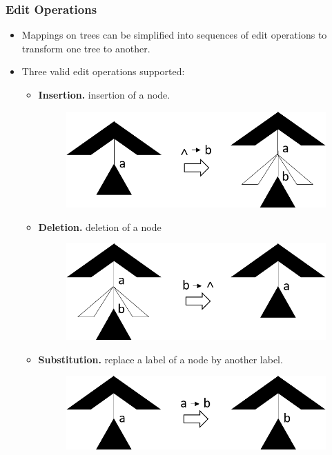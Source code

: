 \documentclass{beamer}
\begin{document}

\begin{frame}
\frametitle{Edit Operations}
\begin{itemize}
\item Mappings on trees can be simplified into sequences of edit operations to transform one tree to another.
\item Three valid edit operations supported:
\begin{itemize}
\item \textbf{Insertion.} insertion of a node.
\begin{figure}
	\includegraphics[width=0.4\linewidth]{Insertion}
	\label{Insertion} 
	\centering
\end{figure}
\item \textbf{Deletion.} deletion of a node
\begin{figure}
	\includegraphics[width=0.4\linewidth]{Delete}
	\label{Deletion} 
	\centering
\end{figure}
\item \textbf{Substitution.} replace a label of a node by another label. 
\begin{figure}
	\includegraphics[width=0.4\linewidth]{Replacement}
	\label{Substitution} 
	\centering
\end{figure}
\end{itemize}
\end{itemize}
\end{frame}				
\end{document}
